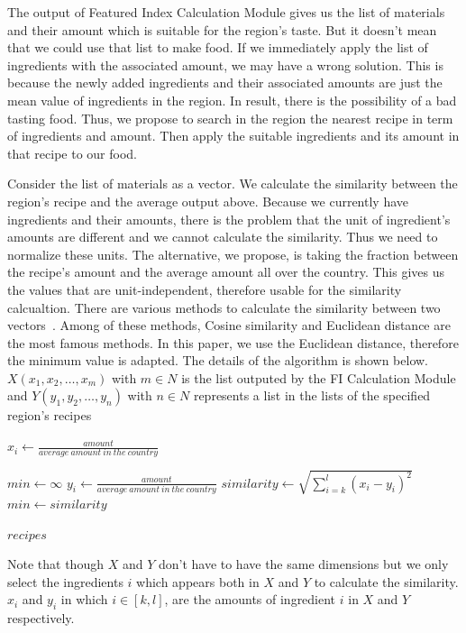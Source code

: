 The output of Featured Index Calculation Module gives us the list of materials and their amount which is suitable for the region's taste. But it doesn't mean that we could use that list to make food. If we immediately apply the list of ingredients with the associated amount, we may have a wrong solution. This is because the newly added ingredients and their associated amounts are just the mean value of ingredients in the region. In result, there is the possibility of a bad tasting food. Thus, we propose to search in the region the nearest recipe in term of ingredients and amount. Then apply the suitable ingredients and its amount in that recipe to our food.        

Consider the list of materials as a vector. We calculate the similarity between the region's recipe and the average output above. Because we currently have ingredients and their amounts, there is the problem that the unit of ingredient's amounts are different and we cannot calculate the similarity. Thus we need to normalize these units. The alternative, we propose, is taking the fraction between the recipe's amount and the average amount all over the country. This gives us the values that are unit-independent, therefore usable for the similarity calcualtion. There are various methods to calculate the similarity between two vectors~\cite{cosine,euclidean,Qian:2004:SEC:967900.968151}. Among of these methods, Cosine similarity and Euclidean distance are the most famous methods. In this paper, we use the Euclidean distance, therefore the minimum value is adapted. The details of the algorithm is shown below. $X(x_1,x_2,\ldots,x_m)$ with $m \in N $ is the list outputed by the FI Calculation Module and $Y(y_1,y_2,\ldots,y_n)$ with $n \in N $ represents a list in the lists of the specified region's recipes 


\begin{algorithmic}

\State $ x_i \gets \frac{\displaystyle amount}{\displaystyle average\ amount\ in\ the\ country}$
\EndFor

\State $min \gets \infty $
\State $ y_i \gets \frac{\displaystyle amount}{\displaystyle average\ amount\ in\ the\ country}$
\EndFor
\State $ similarity \gets \sqrt{\displaystyle \sum^l_{i=k}{(x_i-y_i)^2}}$
\State $ min \gets similarity $
\EndIf
\EndFor


\Return $recipes$



\end{algorithmic}

Note that though $X$ and $Y$ don't have to have the same dimensions but we only select the ingredients $i$ which appears both in $X$ and $Y$ to calculate the similarity. $x_i$ and $y_i$ in which $i \in [k,l]$, are the amounts of ingredient $i$ in $X$ and $Y$ respectively.